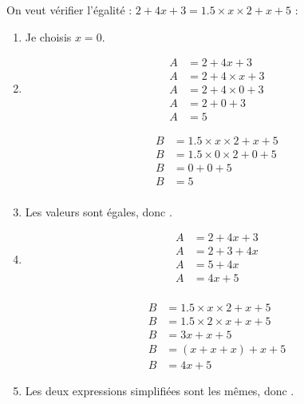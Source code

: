 \documentclass[12pt,a4paper]{article}
\begin{document}
\begin{myex}
	
	On veut vérifier l'égalité : $2 + 4x + 3 = \num{1.5} \times x \times 2 + x + 5$ :
	\begin{enumerate}
		\item Je choisis $x=0$.
		\item 
		
		\begin{multicols}{2}
			\begin{align*}
			A &= 2 + 4x + 3  \\
			A &= 2 + 4 \times x + 3  \\
			A  &= 2 + 4 \times 0 + 3  \\
			A  &= 2 + 0 + 3  \\
			A  &= 5
			\end{align*}
			
			
			\begin{align*}
			B &= \num{1.5} \times x \times 2 + x + 5 \\
			B &= \num{1.5} \times 0 \times 2 + 0 + 5 \\
			B &= 0 + 0 + 5 \\
			B &= 5 \\							
			\end{align*}
		\end{multicols}
		
		\item Les valeurs sont égales, donc .
		
		\item \begin{multicols}{2}
			\begin{align*}
				A &= 2 + 4x + 3  \\
				A &= 2 + 3 + 4x  \\
				A  &= 5 + 4x  \\
				A  &= 4x + 5  \\	
			\end{align*}
			
			
			\begin{align*}
				B &= \num{1.5} \times x \times 2 + x + 5 \\
				B &= \num{1.5} \times 2 \times x + x + 5 \\
				B &= 3x + x + 5 \\
				B &= (x + x + x) + x + 5 \\						
				B &= 4x + 5 
			\end{align*}
		\end{multicols}
	
		\item Les deux expressions simplifiées sont les mêmes, donc .
	\end{enumerate}
	
\end{myex}
\end{document}

